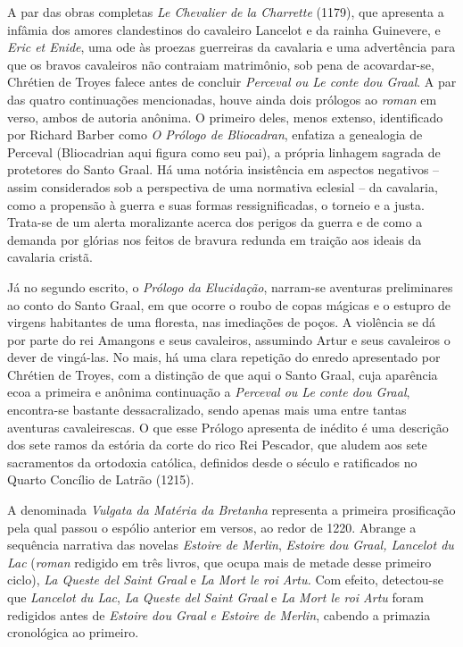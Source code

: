 A par das obras completas \textit{Le Chevalier de la Charrette }(1179), que
apresenta a infâmia dos amores clandestinos do cavaleiro Lancelot e da rainha
Guinevere, e \textit{Eric et Enide}, uma ode às proezas guerreiras da cavalaria
e uma advertência para que os bravos cavaleiros não contraiam matrimônio, sob
pena de acovardar-se, Chrétien de Troyes falece antes de concluir
\textit{Perceval ou Le conte dou Graal}. A par das quatro continuações
mencionadas, houve ainda dois prólogos ao \textit{roman} em verso, ambos de
autoria anônima. O primeiro deles, menos extenso, identificado por Richard
Barber como \textit{O Prólogo de Bliocadran}, enfatiza a genealogia de Perceval
(Bliocadrian aqui figura como seu pai), a própria linhagem sagrada de
protetores do Santo Graal. Há uma notória insistência em aspectos negativos --
assim considerados sob a perspectiva de uma normativa eclesial -- da cavalaria,
como a propensão à guerra e suas formas ressignificadas, o torneio e a justa.
Trata-se de um alerta moralizante acerca dos perigos da guerra e de como a
demanda por glórias nos feitos de bravura redunda em traição aos ideais da
cavalaria cristã.

Já no segundo escrito, o \textit{Prólogo da Elucidação}, narram-se aventuras
preliminares ao conto do Santo Graal, em que ocorre o roubo de copas mágicas e
o estupro de virgens habitantes de uma floresta, nas imediações de poços. A
violência se dá por parte do rei Amangons e seus cavaleiros, assumindo Artur e
seus cavaleiros o dever de vingá-las. No mais, há uma clara repetição do enredo
apresentado por Chrétien de Troyes, com a distinção de que aqui o Santo Graal,
cuja aparência ecoa a primeira e anônima continuação a \textit{Perceval ou Le
conte dou Graal}, encontra-se bastante dessacralizado, sendo apenas mais uma
entre tantas aventuras cavaleirescas. O que esse Prólogo apresenta de inédito é
uma descrição dos sete ramos da estória da corte do rico Rei Pescador, que
aludem aos sete sacramentos da ortodoxia católica, definidos desde o século 
e ratificados no Quarto Concílio de Latrão (1215).

A denominada \textit{Vulgata da Matéria da Bretanha} representa a primeira
prosificação pela qual passou o espólio anterior em versos, ao redor de 1220.
Abrange a sequência narrativa das novelas \textit{Estoire de Merlin},
\textit{Estoire dou Graal, Lancelot du Lac }(\textit{roman} redigido em três
livros, que ocupa mais de metade desse primeiro ciclo), \textit{La Queste del
Saint Graal} e \textit{La Mort le roi Artu. }Com efeito, detectou-se que
\textit{Lancelot du Lac}, \textit{La Queste del Saint Graal} e \textit{La Mort
le roi Artu} foram redigidos antes de \textit{Estoire dou Graal} \textit{e
Estoire de Merlin}, cabendo a primazia cronológica ao primeiro. 

